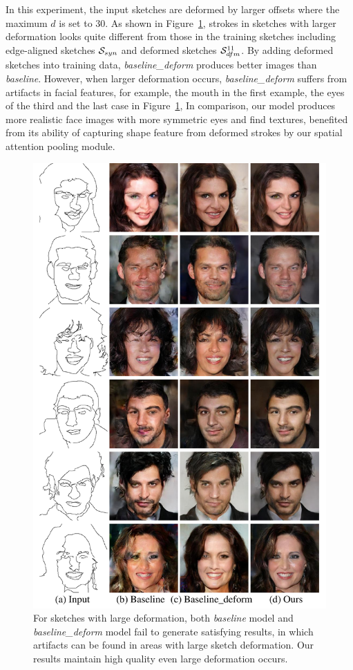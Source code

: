 In this experiment, the input sketches are deformed by larger offsets where the maximum $d$ is set to $30$. 
As shown in Figure~\ref{fig:generalization_examples}, strokes in sketches with larger deformation looks quite different from those in the training sketches including edge-aligned sketches $\mathcal{S}_{syn}$ and deformed sketches $\mathcal{S}_{dfm}^{11}$. 
%
By adding deformed sketches into training data, \textit{baseline\_deform} produces better images than \textit{baseline}. However, when larger deformation occurs, \textit{baseline\_deform} suffers from artifacts in facial features, for example, the mouth in the first example, the eyes of the third and the last case in Figure~\ref{fig:generalization_examples}, 
In comparison, our model produces more realistic face images with more symmetric eyes and find textures, benefited from its ability of capturing shape feature from deformed strokes by our spatial attention pooling module. 
\begin{figure}
	\includegraphics[width=0.9\linewidth]{figs/generalization_examples}
	\caption{For sketches with large deformation, both \textit{baseline} model and \textit{baseline\_deform} model fail to generate satisfying results, in which artifacts can be found in areas with large sketch deformation. Our results maintain high quality even large deformation occurs.  }
	\label{fig:generalization_examples}
\end{figure}

